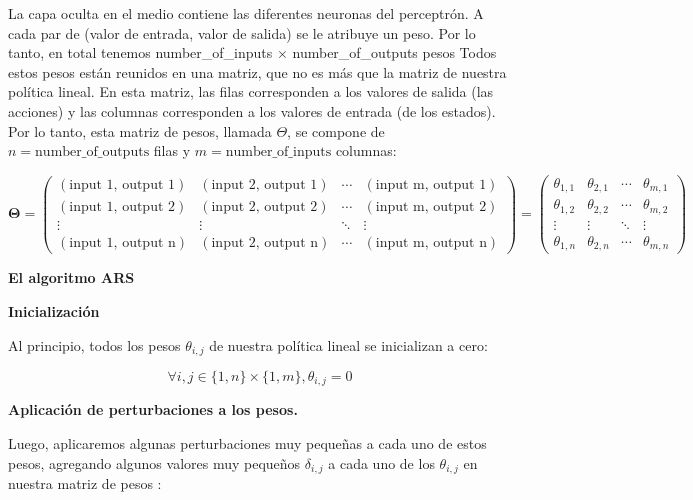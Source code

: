 \documentclass[
]{book}
\begin{document}
La capa oculta en el medio contiene las diferentes neuronas del perceptrón. A cada par de (valor de entrada, valor de salida) se le atribuye un peso. Por lo tanto, en total tenemos number\_of\_inputs \(\times\) number\_of\_outputs pesos Todos estos pesos están reunidos en una matriz, que no es más que la matriz de nuestra política lineal. En esta matriz, las filas corresponden a los valores de salida (las acciones) y las columnas corresponden a los valores de entrada (de los estados). Por lo tanto, esta matriz de pesos, llamada \(\Theta\), se compone de \(n = \textrm{number\_of\_outputs}\) filas y \(m = \textrm{number\_of\_inputs}\) columnas:

\[
\boldsymbol{\Theta}
=
\begin{pmatrix}
(\textrm{input 1, output 1}) & (\textrm{input 2, output 1}) & \cdots & (\textrm{input m, output 1}) \\
(\textrm{input 1, output 2}) & (\textrm{input 2, output 2}) & \cdots & (\textrm{input m, output 2}) \\
\vdots & \vdots & \ddots & \vdots \\
(\textrm{input 1, output n}) & (\textrm{input 2, output n}) & \cdots & (\textrm{input m, output n})
\end{pmatrix}
=
\begin{pmatrix}
\theta_{1,1} & \theta_{2,1} & \cdots & \theta_{m,1} \\
\theta_{1,2} & \theta_{2,2} & \cdots & \theta_{m,2} \\
\vdots & \vdots & \ddots & \vdots \\
\theta_{1,n} & \theta_{2,n} & \cdots & \theta_{m,n}
\end{pmatrix}
\]

\textbf{El algoritmo ARS}

\textbf{Inicialización}

Al principio, todos los pesos \(\theta_{i, j}\) de nuestra política lineal se inicializan a cero:

\[\forall i,j \in \{1,n\}\times\{1,m\}, \theta_{i,j} = 0\]

\textbf{Aplicación de perturbaciones a los pesos.}

Luego, aplicaremos algunas perturbaciones muy pequeñas a cada uno de estos pesos, agregando algunos valores muy pequeños \(\delta_{i, j}\) a cada uno de los \(\theta_{i, j}\) en nuestra matriz de pesos :
\end{document}
